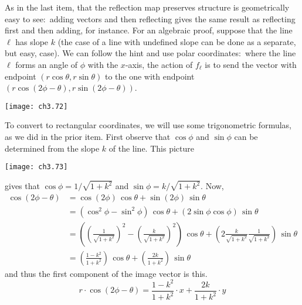 \begin{exercises}
\begin{answer}
\begin{exparts}
          As in the last item, that the reflection map preserves
          structure is geometrically easy to see:~adding vectors and then 
          reflecting gives the same result as reflecting first and then
          adding, for instance.
          For an algebraic proof, suppose that the line $\ell$ has slope $k$
          (the case of a line with undefined slope can be done as a separate,
          but easy, case).
          We can follow the hint and use
          polar coordinates:~where the line \( \ell \) forms an angle of
          \( \phi \) with the \( x \)-axis, the action of \( f_\ell \) is to
          send the vector with endpoint \( (r\cos\theta,r\sin\theta) \) to 
          the one with endpoint 
          \( (r\cos(2\phi-\theta),r\sin(2\phi-\theta)) \).          
          \begin{center}  \small
            \texttt{[image: ch3.72]}
          \end{center}
          To convert to rectangular coordinates, we will use some trigonometric
          formulas, as we  did in the prior item.
          First observe that $\cos\phi$ and $\sin\phi$ can be determined
          from the slope $k$ of the line.
          This picture
          \begin{center}  \small
            \texttt{[image: ch3.73]}
          \end{center}
          gives that $\cos\phi=1/\sqrt{1+k^2}$ and $\sin\phi=k/\sqrt{1+k^2}$.
          Now,
          \begin{align*}
            \cos(2\phi-\theta)
              &=\cos(2\phi)\,\cos\theta+\sin(2\phi)\,\sin\theta        \\
              &=\left(\cos^2\phi-\sin^2\phi\right)\,\cos\theta
                 +\left(2\sin\phi\cos\phi\right)\,\sin\theta        \\
              &=\left((\frac{1}{\sqrt{1+k^2}})^2
                      -(\frac{k}{\sqrt{1+k^2}})^2\right)
                   \,\cos\theta
                 +\left(2\frac{k}{\sqrt{1+k^2}}\frac{1}{\sqrt{1+k^2}}\right)
                   \,\sin\theta        \\
              &=\left(\frac{1-k^2}{1+k^2}\right)\,\cos\theta
                 +\left(\frac{2k}{1+k^2}\right)\,\sin\theta        
          \end{align*}
          and thus the first component of the image vector is this.
          \begin{equation*}
            r\cdot\cos(2\phi-\theta)=\frac{1-k^2}{1+k^2}\cdot x
                                     +\frac{2k}{1+k^2}\cdot y

\end{equation*}
\end{exparts}
\end{answer}
\end{exercises}

